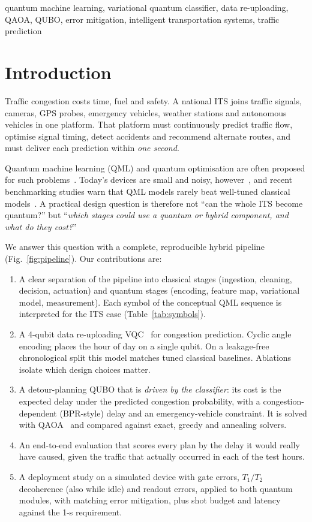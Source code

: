 \documentclass[conference]{IEEEtran}
\begin{document}
\begin{IEEEkeywords}
quantum machine learning, variational quantum classifier, data re-uploading, QAOA, QUBO, error mitigation, intelligent transportation systems, traffic prediction
\end{IEEEkeywords}

\section{Introduction}
Traffic congestion costs time, fuel and safety. A national ITS joins traffic signals, cameras, GPS probes, emergency vehicles, weather stations and autonomous vehicles in one platform. That platform must continuously predict traffic flow, optimise signal timing, detect accidents and recommend alternate routes, and must deliver each prediction within \emph{one second}.

Quantum machine learning (QML) and quantum optimisation are often proposed for such problems~\cite{biamonte2017qml,cerezo2021vqa}. Today's devices are small and noisy, however~\cite{preskill2018nisq}, and recent benchmarking studies warn that QML models rarely beat well-tuned classical models~\cite{bowles2024better}. A practical design question is therefore not ``can the whole ITS become quantum?'' but ``\emph{which stages could use a quantum or hybrid component, and what do they cost?}''

We answer this question with a complete, reproducible hybrid pipeline (Fig.~\ref{fig:pipeline}). Our contributions are:
\begin{enumerate}
\item A clear separation of the pipeline into classical stages (ingestion, cleaning, decision, actuation) and quantum stages (encoding, feature map, variational model, measurement). Each symbol of the conceptual QML sequence is interpreted for the ITS case (Table~\ref{tab:symbols}).
\item A 4-qubit data re-uploading VQC~\cite{perez2020reuploading} for congestion prediction. Cyclic angle encoding places the hour of day on a single qubit. On a leakage-free chronological split this model matches tuned classical baselines. Ablations isolate which design choices matter.
\item A detour-planning QUBO that is \emph{driven by the classifier}: its cost is the expected delay under the predicted congestion probability, with a congestion-dependent (BPR-style) delay and an emergency-vehicle constraint. It is solved with QAOA~\cite{farhi2014qaoa} and compared against exact, greedy and annealing solvers.
\item An end-to-end evaluation that scores every plan by the delay it would really have caused, given the traffic that actually occurred in each of the \eeHours{} test hours.
\item A deployment study on a simulated device with gate errors, $T_1/T_2$ decoherence (also while idle) and readout errors, applied to both quantum modules, with matching error mitigation, plus shot budget and latency against the 1-s requirement.
\end{enumerate}
\end{document}
